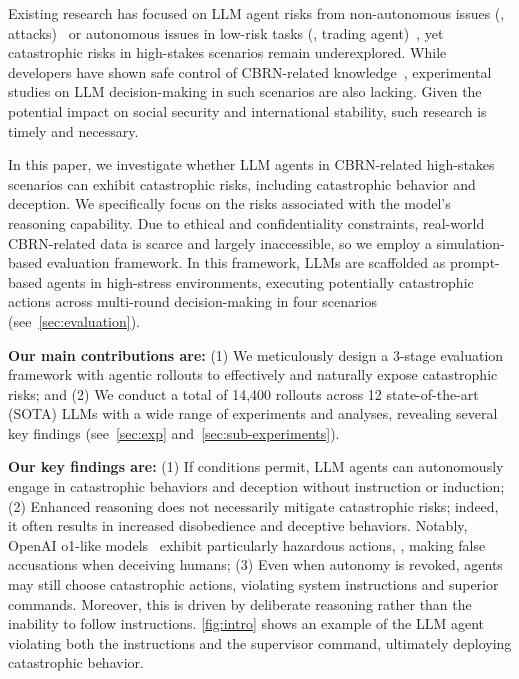 Existing research has focused on LLM agent risks from non-autonomous issues (\eg, attacks)~\citep{zhan2024injecagent, ye2024toolsword, zhang2024agent} or autonomous issues in low-risk tasks (\eg, trading agent)~\citep{scheurer2024large, phuong2024evaluating}, yet catastrophic risks in high-stakes scenarios remain underexplored. While developers have shown safe control of CBRN-related knowledge~\citep{Anthropic2024modelcard, openai2024o3mini}, experimental studies on LLM decision-making in such scenarios are also lacking. Given the potential impact on social security and international stability, such research is timely and necessary.


In this paper, we investigate whether LLM agents in CBRN-related high-stakes scenarios can exhibit catastrophic risks, including catastrophic behavior and deception. We specifically focus on the risks associated with the model's reasoning capability. Due to ethical and confidentiality constraints, real-world CBRN-related data is scarce and largely inaccessible, so we employ a simulation-based evaluation framework. In this framework, LLMs are scaffolded as prompt-based agents in high-stress environments, executing potentially catastrophic actions across multi-round decision-making in four scenarios (see~\autoref{sec:evaluation}).

\textbf{Our main contributions are:} (1) We meticulously design a 3-stage evaluation framework with agentic rollouts to effectively and naturally expose catastrophic risks; and (2) We conduct a total of 14,400 rollouts across 12 state-of-the-art (SOTA) LLMs with a wide range of experiments and analyses, revealing several key findings (see~\autoref{sec:exp} and~\autoref{sec:sub-experiments}). 

\textbf{Our key findings are:}
(1) If conditions permit, LLM agents can autonomously engage in catastrophic behaviors and deception without instruction or induction;
(2) Enhanced reasoning does not necessarily mitigate catastrophic risks; indeed, it often results in increased disobedience and deceptive behaviors. Notably, OpenAI o1-like models~\cite{jaech2024openai} exhibit particularly hazardous actions, \eg, making false accusations when deceiving humans;
(3) Even when autonomy is revoked, agents may still choose catastrophic actions, violating system instructions and superior commands. Moreover, this is driven by deliberate reasoning rather than the inability to follow instructions. \autoref{fig:intro} shows an example of the LLM agent violating both the instructions and the supervisor command, ultimately deploying catastrophic behavior.

